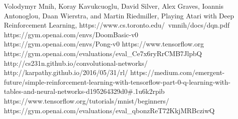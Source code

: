 \documentclass[12pt]{article}
\theoremstyle{plain}
\theoremstyle{definition}
\theoremstyle{remark}
\theoremstyle{plain}
\begin{document}
\begin{thebibliography}{9}
 Volodymyr Mnih, Koray Kavukcuoglu, David Silver, Alex Graves, Ioannis Antonoglou,
Daan Wierstra, and Martin Riedmiller, Playing Atari with Deep Reinforcement Learning, https://www.cs.toronto.edu/~vmnih/docs/dqn.pdf 
 
 https://gym.openai.com/envs/DoomBasic-v0
 https://gym.openai.com/envs/Pong-v0
 https://www.tensorflow.org
 https://gym.openai.com/evaluations/eval\_Ce7x6ryRrCMB7JlpbQ 
 http://cs231n.github.io/convolutional-networks/
 http://karpathy.github.io/2016/05/31/rl/
 https://medium.com/emergent-future/simple-reinforcement-learning-with-tensorflow-part-0-q-learning-with-tables-and-neural-networks-d195264329d0\#.1u6k2rpib
 https://www.tensorflow.org/tutorials/mnist/beginners/
 https://gym.openai.com/evaluations/eval\_qbonzReT72KkjMRBcziwQ
\end{thebibliography}
\end{document}
